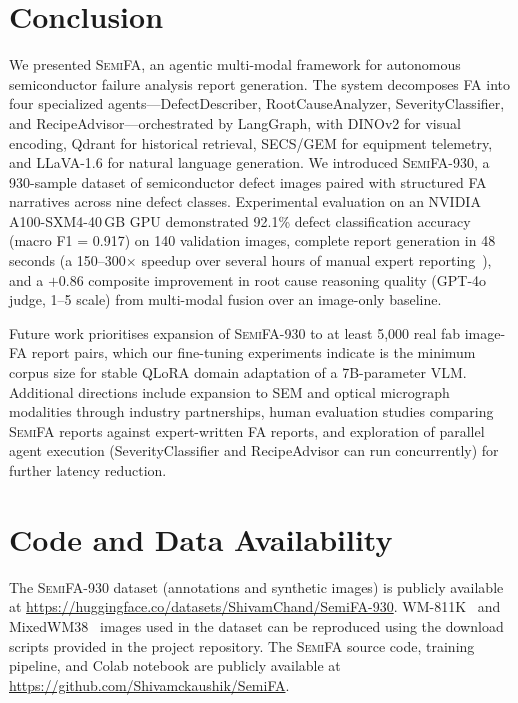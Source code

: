 \documentclass[conference]{IEEEtran}
\newcommand{\semifa}{\textsc{SemiFA}}
\newcommand{\semidataset}{\textsc{SemiFA-930}}
\begin{document}
\section{Conclusion}
\label{sec:conclusion}

We presented \semifa{}, an agentic multi-modal framework for autonomous semiconductor failure analysis report generation.
The system decomposes FA into four specialized agents---DefectDescriber, RootCauseAnalyzer, SeverityClassifier, and RecipeAdvisor---orchestrated by LangGraph, with DINOv2 for visual encoding, Qdrant for historical retrieval, SECS/GEM for equipment telemetry, and LLaVA-1.6 for natural language generation.
We introduced \semidataset{}, a 930-sample dataset of semiconductor defect images paired with structured FA narratives across nine defect classes.
Experimental evaluation on an NVIDIA A100-SXM4-40\,GB GPU demonstrated 92.1\% defect classification accuracy (macro F1 = 0.917) on 140 validation images, complete report generation in 48 seconds (a 150--300$\times$ speedup over several hours of manual expert reporting~\cite{kla2023klarity,amat2023actionable}), and a $+$0.86 composite improvement in root cause reasoning quality (GPT-4o judge, 1--5 scale) from multi-modal fusion over an image-only baseline.

Future work prioritises expansion of \semidataset{} to at least 5{,}000 real fab image-FA report pairs, which our fine-tuning experiments indicate is the minimum corpus size for stable QLoRA domain adaptation of a 7B-parameter VLM.
Additional directions include expansion to SEM and optical micrograph modalities through industry partnerships, human evaluation studies comparing \semifa{} reports against expert-written FA reports, and exploration of parallel agent execution (SeverityClassifier and RecipeAdvisor can run concurrently) for further latency reduction.

\section*{Code and Data Availability}

The \semidataset{} dataset (annotations and synthetic images) is publicly available at \url{https://huggingface.co/datasets/ShivamChand/SemiFA-930}.
WM-811K~\cite{wu2015wafer} and MixedWM38~\cite{wang2020mixedwm38} images used in the dataset can be reproduced using the download scripts provided in the project repository.
The \semifa{} source code, training pipeline, and Colab notebook are publicly available at \url{https://github.com/Shivamckaushik/SemiFA}.
\end{document}
